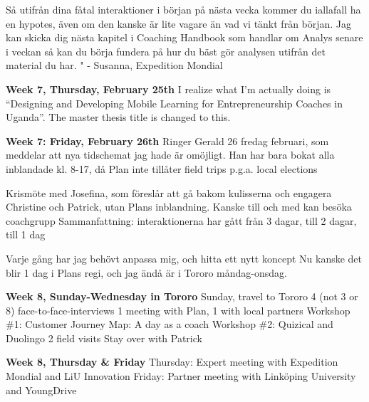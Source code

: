 Så utifrån dina fåtal interaktioner i början på nästa vecka kommer du iallafall ha en hypotes, även om den kanske är lite vagare än vad vi tänkt från början. Jag kan skicka dig nästa kapitel i Coaching Handbook som handlar om Analys senare i veckan så kan du börja fundera på hur du bäst gör analysen utifrån det material du har. " - Susanna, Expedition Mondial

\textbf{Week 7, Thursday, February 25th}
I realize what I’m actually doing is “Designing and Developing Mobile Learning for Entrepreneurship Coaches in Uganda”. The master thesis title is changed to this.

\textbf{Week 7: Friday, February 26th}
Ringer Gerald 26 fredag februari, som meddelar att nya tidschemat jag hade är omöjligt. Han har bara bokat alla inblandade kl. 8-17, då Plan inte tillåter field trips p.g.a. local elections

Krismöte med Josefina, som föreslår att gå bakom kulisserna och engagera Christine och Patrick, utan Plans inblandning. Kanske till och med kan besöka coachgrupp
Sammanfattning: interaktionerna har gått från 3 dagar, till 2 dagar, till 1 dag

Varje gång har jag behövt anpassa mig, och hitta ett nytt koncept
Nu kanske det blir 1 dag i Plans regi, och jag ändå är i Tororo måndag-onsdag.

\textbf{Week 8, Sunday-Wednesday in Tororo}
Sunday, travel to Tororo
4 (not 3 or 8) face-to-face-interviews
1 meeting with Plan, 1 with local partners
Workshop \#1: Customer Journey Map: A day as a coach
Workshop \#2: Quizical and Duolingo
2 field visits
Stay over with Patrick

\textbf{Week 8, Thursday \& Friday}
Thursday: Expert meeting with Expedition Mondial and LiU Innovation
Friday: Partner meeting with Linköping University and YoungDrive